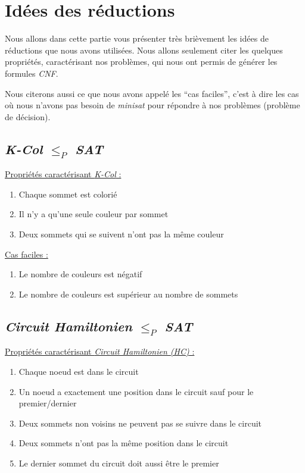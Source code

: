  \section{Idées des réductions}
 Nous allons dans cette partie vous présenter très brièvement les idées
 de réductions que nous avons utilisées. Nous allons seulement citer les
 quelques propriétés, caractérisant nos problèmes, qui nous ont permis
 de générer les formules \emph{CNF}.
 
 Nous citerons aussi ce que nous avons appelé les ``cas
 faciles'', c'est à dire les cas où nous n'avons pas besoin de
 \emph{minisat} pour répondre à nos problèmes (problème de décision).

  \subsection{\emph{K-Col} $\leq_P$ \emph{SAT}}
  \underline{Propriétés caractérisant \emph{K-Col} :}
  \begin{enumerate}
   \item Chaque sommet est colorié
   \item Il n'y a qu'une seule couleur par sommet
   \item Deux sommets qui se suivent n'ont pas la même couleur
  \end{enumerate}

  \underline{Cas faciles :}
  \begin{enumerate}
   \item Le nombre de couleurs est négatif
   \item Le nombre de couleurs est supérieur au nombre de sommets
  \end{enumerate}

  \subsection{\emph{Circuit Hamiltonien} $\leq_P$ \emph{SAT}}
  \underline{Propriétés caractérisant \emph{Circuit Hamiltonien (HC)} :}
  \begin{enumerate}
   \item Chaque noeud est dans le circuit
   \item Un noeud a exactement une position dans le circuit sauf pour le
	 premier/dernier
   \item Deux sommets non voisins ne peuvent pas se suivre dans le
	 circuit
   \item Deux sommets n'ont pas la même position dans le circuit
   \item Le dernier sommet du circuit doit aussi être le premier
  \end{enumerate}

